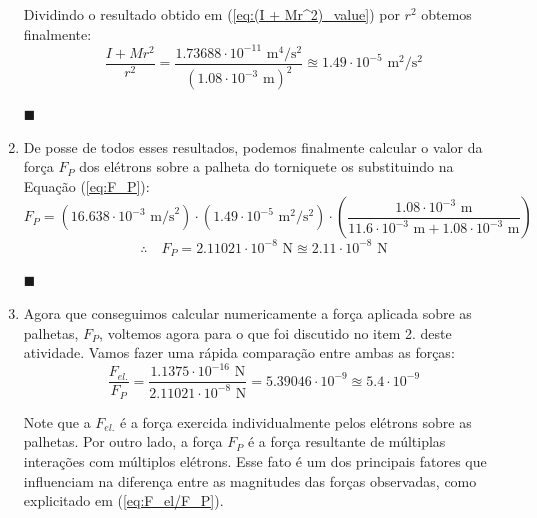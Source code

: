 \documentclass[12pt,a4paper]{article}
\begin{document}
\begin{enumerate}
    Dividindo o resultado obtido em (\ref{eq:(I + Mr^2)_value}) por $r^{2}$ obtemos finalmente:
    \begin{equation} \label{eq:(I+Mr^2)/r^2}
        \boxed{\frac{I+Mr^2}{r^2}=\frac{1.73688\cdot10^{-11}\text{ m}^{4}/\text{s}^{2} }{(1.08\cdot10^{-3}\text{ m})^{2}}\approxeq1.49\cdot10^{-5}\text{ m}^{2}/\text{s}^{2}}        
    \end{equation}
    \begin{flushright}
        $\blacksquare$
    \end{flushright}



    \item De posse de todos esses resultados, podemos finalmente calcular o valor da força $F_P$ dos elétrons sobre a palheta do torniquete os substituindo na Equação (\ref{eq:F_P}):
    \begin{equation*}
        F_{P}=(16.638\cdot10^{-3}\text{ m/s}^{2})\cdot (1.49\cdot10^{-5}\text{ m}^{2}/\text{s}^{2})\cdot\left(\frac{1.08\cdot10^{-3}\text{ m}}{11.6\cdot10^{-3}\text{ m}+1.08\cdot10^{-3}\text{ m}}\right)
    \end{equation*}
    \begin{equation} \label{eq:F_P - value}
        \therefore\quad\boxed{F_P=2.11021\cdot10^{-8}\text{ N}\approxeq2.11\cdot10^{-8}\text{ N}}
    \end{equation}
    \begin{flushright}
        $\blacksquare$
    \end{flushright}



    \item Agora que conseguimos calcular numericamente a força aplicada sobre as palhetas, $F_P$, voltemos agora para o que foi discutido no item 2. deste atividade. Vamos fazer uma rápida comparação entre ambas as forças:
    \begin{equation} \label{eq:F_el/F_P}
        \frac{F_{el.}}{F_P}=\frac{1.1375\cdot10^{-16}\text{ N}}{2.11021\cdot10^{-8}\text{ N}}=5.39046\cdot10^{-9}\approxeq5.4\cdot10^{-9}
    \end{equation}
    
    Note que a $F_{el.}$ é a força exercida individualmente pelos elétrons sobre as palhetas. Por outro lado, a força $F_{P}$ é a força resultante de múltiplas interações com múltiplos elétrons. Esse fato é um dos principais fatores que influenciam na diferença entre as magnitudes das forças observadas, como explicitado em (\ref{eq:F_el/F_P}).


\end{enumerate}
\end{document}
